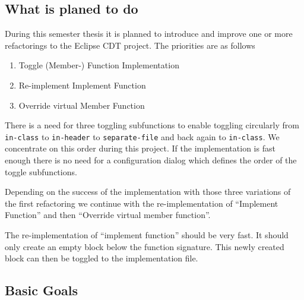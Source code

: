 \documentclass[a4paper,10pt]{scrreprt}
\begin{document}
\subsection*{What is planed to do}

During this semester thesis it is planned to introduce and improve one or more
refactorings to the Eclipse CDT project. The priorities are as follows

\begin{enumerate}
\item Toggle (Member-) Function Implementation
\item Re-implement Implement Function
\item Override virtual Member Function
\end{enumerate}

There is a need for three toggling subfunctions to enable toggling circularly from \texttt{in-class}
to \texttt{in-header} to \texttt{separate-file}  and back again to
\texttt{in-class}. We concentrate on this order during this project. If the
implementation is fast enough there is no need for a configuration dialog which
defines the order of the toggle subfunctions.\newline

Depending on the success of the implementation with those three variations of the
first refactoring we continue with the re-implementation of  ``Implement
Function'' and then ``Override virtual member function''.\newline

The re-implementation of ``implement function'' should be very fast. It should
only create an empty block below the function signature. This newly created
block can then be toggled to the implementation file.

\subsection*{Basic Goals}
\end{document}
